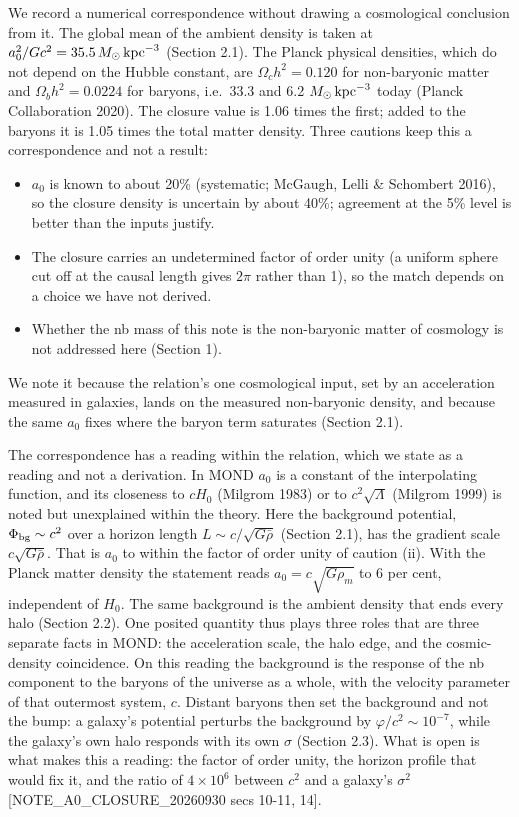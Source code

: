 \documentclass[
  10pt,
]{article}
\begin{document}
We record a numerical correspondence without drawing a cosmological
conclusion from it. The global mean of the ambient density is taken at
$a_0^2/Gc^2=35.5\,M_\odot\,{\rm kpc}^{-3}$ (Section 2.1). The Planck
physical densities, which do not depend on the Hubble constant, are
$\Omega_ch^2=0.120$ for non-baryonic matter and $\Omega_bh^2=0.0224$ for
baryons, i.e.\ 33.3 and 6.2 $M_\odot\,{\rm kpc}^{-3}$ today (Planck
Collaboration 2020). The closure value is 1.06 times the first; added to
the baryons it is 1.05 times the total matter density. Three cautions keep
this a correspondence and not a result:
\begin{itemize}
\item[(i)] $a_0$ is known to about 20\% (systematic; McGaugh, Lelli \& Schombert 2016), so the closure density is uncertain by about 40\%; agreement at the 5\% level is better than the inputs justify.
\item[(ii)] The closure carries an undetermined factor of order unity (a uniform sphere cut off at the causal length gives $2\pi$ rather than 1), so the match depends on a choice we have not derived.
\item[(iii)] Whether the nb mass of this note is the non-baryonic matter of cosmology is not addressed here (Section 1).
\end{itemize}
We note it because the relation's one cosmological input, set by an acceleration measured in galaxies, lands on the measured non-baryonic density, and because the same $a_0$ fixes where the baryon term saturates (Section 2.1).

The correspondence has a reading within the relation, which we state as a reading and not a derivation. In MOND $a_0$ is a constant of the interpolating function, and its closeness to $cH_0$ (Milgrom 1983) or to $c^2\sqrt{\Lambda}$ (Milgrom 1999) is noted but unexplained within the theory. Here the background potential, $\Phi_{\rm bg}\sim c^2$ over a horizon length $L\sim c/\sqrt{G\bar\rho}$ (Section 2.1), has the gradient scale $c\sqrt{G\bar\rho}$. That is $a_0$ to within the factor of order unity of caution (ii). With the Planck matter density the statement reads $a_0=c\sqrt{G\rho_m}$ to 6 per cent, independent of $H_0$. The same background is the ambient density that ends every halo (Section 2.2). One posited quantity thus plays three roles that are three separate facts in MOND: the acceleration scale, the halo edge, and the cosmic-density coincidence. On this reading the background is the response of the nb component to the baryons of the universe as a whole, with the velocity parameter of that outermost system, $c$. Distant baryons then set the background and not the bump: a galaxy's potential perturbs the background by $\varphi/c^2\sim10^{-7}$, while the galaxy's own halo responds with its own $\sigma$ (Section 2.3). What is open is what makes this a reading: the factor of order unity, the horizon profile that would fix it, and the ratio of $4\times10^6$ between $c^2$ and a galaxy's $\sigma^2$ {[}NOTE\_A0\_CLOSURE\_20260930 secs 10-11, 14{]}.
\end{document}
